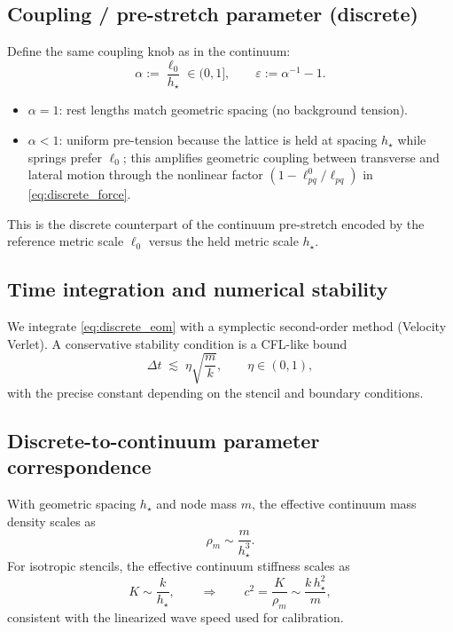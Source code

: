 \documentclass[11pt,a4paper]{article}
\begin{document}
\subsection{Coupling / pre-stretch parameter (discrete)}
Define the same coupling knob as in the continuum:
\begin{equation}
  \alpha := \frac{\ell_0}{h_\star}\in(0,1],
  \qquad
  \varepsilon := \alpha^{-1}-1.
  \label{eq:discrete_alpha}
\end{equation}
\begin{itemize}
\item $\alpha=1$: rest lengths match geometric spacing (no background tension).
\item $\alpha<1$: uniform pre-tension because the lattice is held at spacing $h_\star$
      while springs prefer $\ell_0$; this amplifies geometric coupling between
      transverse and lateral motion through the nonlinear factor
      $(1-\ell^0_{pq}/\ell_{pq})$ in \eqref{eq:discrete_force}.
\end{itemize}
This is the discrete counterpart of the continuum pre-stretch encoded by the
reference metric scale $\ell_0$ versus the held metric scale $h_\star$.

\subsection{Time integration and numerical stability}
We integrate \eqref{eq:discrete_eom} with a symplectic second-order method (Velocity Verlet).
A conservative stability condition is a CFL-like bound
\begin{equation}
  \Delta t \;\lesssim\; \eta \sqrt{\frac{m}{k}},
  \qquad \eta\in(0,1),
\end{equation}
with the precise constant depending on the stencil and boundary conditions.

\subsection{Discrete-to-continuum parameter correspondence}
With geometric spacing $h_\star$ and node mass $m$, the effective continuum mass
density scales as
\begin{equation}
  \rho_m \sim \frac{m}{h_\star^3}.
\end{equation}
For isotropic stencils, the effective continuum stiffness scales as
\begin{equation}
  K \sim \frac{k}{h_\star},
  \qquad\Rightarrow\qquad
  c^2=\frac{K}{\rho_m}\sim \frac{k\,h_\star^2}{m},
\end{equation}
consistent with the linearized wave speed used for calibration.
\end{document}
